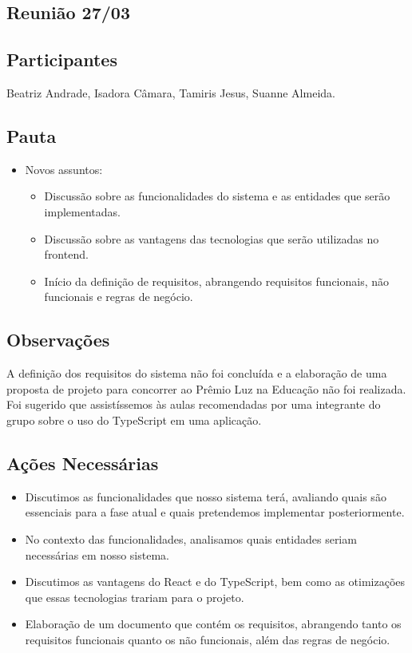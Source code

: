 \begin{apendicesenv}
\section*{Reunião 27/03}

\subsection*{Participantes}
Beatriz Andrade, Isadora Câmara, Tamiris Jesus, Suanne Almeida.

\subsection*{Pauta}
\begin{itemize}
    \item Novos assuntos:
    \begin{itemize}
        \item Discussão sobre as funcionalidades do sistema e as entidades que serão implementadas.
        \item Discussão sobre as vantagens das tecnologias que serão utilizadas no frontend.
        \item Início da definição de requisitos, abrangendo requisitos funcionais, não funcionais e regras de negócio.
    \end{itemize}
\end{itemize}

\subsection*{Observações}
A definição dos requisitos do sistema não foi concluída e a elaboração de uma proposta de projeto para concorrer ao Prêmio Luz na Educação não foi realizada.
Foi sugerido que assistíssemos às aulas recomendadas por uma integrante do grupo sobre o uso do TypeScript em uma aplicação.

\subsection*{Ações Necessárias}
\begin{itemize}
    \item Discutimos as funcionalidades que nosso sistema terá, avaliando quais são essenciais para a fase atual e quais pretendemos implementar posteriormente.
    \item No contexto das funcionalidades, analisamos quais entidades seriam necessárias em nosso sistema.
    \item Discutimos as vantagens do React e do TypeScript, bem como as otimizações que essas tecnologias trariam para o projeto.
    \item Elaboração de um documento que contém os requisitos, abrangendo tanto os requisitos funcionais quanto os não funcionais, além das regras de negócio.
\end{itemize}


\end{apendicesenv}
